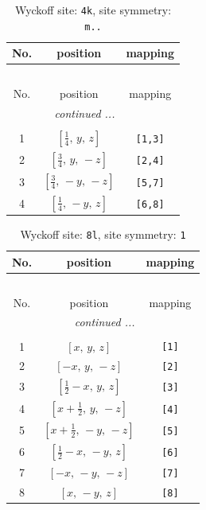 \documentclass[fleqn,8pt]{jsarticle}
\begin{document}
\renewcommand{\arraystretch}{1.2}
\begin{longtable}{ccc}
\caption{Wyckoff site: {\tt 4k}, site symmetry: {\tt m..}}
 \\
 \hline \hline
No. & position & mapping \\ \hline \endfirsthead

\multicolumn{2}{l}{\tablename\ \thetable{}} \\
 \hline \hline
No. & position & mapping \\ \hline \endhead

 \hline \hline
\multicolumn{2}{r}{\footnotesize\it continued ...} \\ \endfoot

 \hline \hline
\multicolumn{2}{r}{} \\ \endlastfoot

1 & $\left[ \frac{1}{4},\, y,\, z \right]$ & {\tt [1,3]} \\ \hline
2 & $\left[ \frac{3}{4},\, y,\, - z \right]$ & {\tt [2,4]} \\ \hline
3 & $\left[ \frac{3}{4},\, - y,\, - z \right]$ & {\tt [5,7]} \\ \hline
4 & $\left[ \frac{1}{4},\, - y,\, z \right]$ & {\tt [6,8]} \\
\end{longtable}
\renewcommand{\arraystretch}{1.2}
\begin{longtable}{ccc}
\caption{Wyckoff site: {\tt 8l}, site symmetry: {\tt 1}}
 \\
 \hline \hline
No. & position & mapping \\ \hline \endfirsthead

\multicolumn{2}{l}{\tablename\ \thetable{}} \\
 \hline \hline
No. & position & mapping \\ \hline \endhead

 \hline \hline
\multicolumn{2}{r}{\footnotesize\it continued ...} \\ \endfoot

 \hline \hline
\multicolumn{2}{r}{} \\ \endlastfoot

1 & $\left[ x,\, y,\, z \right]$ & {\tt [1]} \\ \hline
2 & $\left[ - x,\, y,\, - z \right]$ & {\tt [2]} \\ \hline
3 & $\left[ \frac{1}{2} - x,\, y,\, z \right]$ & {\tt [3]} \\ \hline
4 & $\left[ x + \frac{1}{2},\, y,\, - z \right]$ & {\tt [4]} \\ \hline
5 & $\left[ x + \frac{1}{2},\, - y,\, - z \right]$ & {\tt [5]} \\ \hline
6 & $\left[ \frac{1}{2} - x,\, - y,\, z \right]$ & {\tt [6]} \\ \hline
7 & $\left[ - x,\, - y,\, - z \right]$ & {\tt [7]} \\ \hline
8 & $\left[ x,\, - y,\, z \right]$ & {\tt [8]} \\
\end{longtable}
\end{document}
